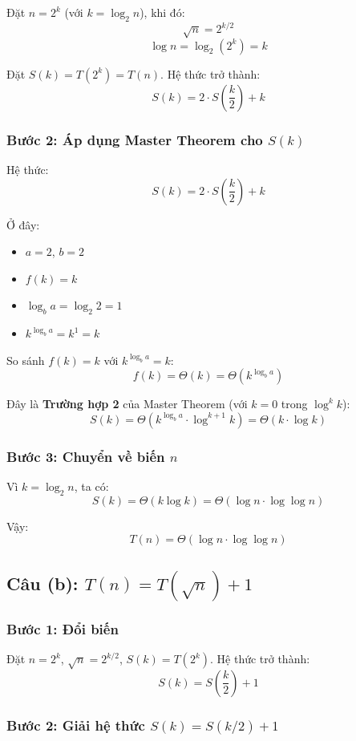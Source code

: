 \documentclass{article}
\begin{document}
Đặt \(n = 2^k\) (với \(k = \log_2 n\)), khi đó:
\[
\sqrt{n} = 2^{k/2}
\]
\[
\log n = \log_2(2^k) = k
\]

Đặt \(S(k) = T(2^k) = T(n)\). Hệ thức trở thành:
\[
S(k) = 2 \cdot S\left(\frac{k}{2}\right) + k
\]

\subsubsection{Bước 2: Áp dụng Master Theorem cho \(S(k)\)}

Hệ thức:
\[
S(k) = 2 \cdot S\left(\frac{k}{2}\right) + k
\]

Ở đây:
\begin{itemize}
    \item \(a = 2\), \(b = 2\)
    \item \(f(k) = k\)
    \item \(\log_b a = \log_2 2 = 1\)
    \item \(k^{\log_b a} = k^1 = k\)
\end{itemize}

So sánh \(f(k) = k\) với \(k^{\log_b a} = k\):
\[
f(k) = \Theta(k) = \Theta(k^{\log_b a})
\]

Đây là \textbf{Trường hợp 2} của Master Theorem (với \(k = 0\) trong \(\log^k k\)):
\[
S(k) = \Theta(k^{\log_b a} \cdot \log^{k+1} k) = \Theta(k \cdot \log k)
\]

\subsubsection{Bước 3: Chuyển về biến \(n\)}

Vì \(k = \log_2 n\), ta có:
\[
S(k) = \Theta(k \log k) = \Theta(\log n \cdot \log \log n)
\]

Vậy:
\[
\boxed{T(n) = \Theta(\log n \cdot \log \log n)}
\]

\subsection{Câu (b): \( T(n) = T(\sqrt{n}) + 1 \)}

\subsubsection{Bước 1: Đổi biến}

Đặt \(n = 2^k\), \(\sqrt{n} = 2^{k/2}\), \(S(k) = T(2^k)\). Hệ thức trở thành:
\[
S(k) = S\left(\frac{k}{2}\right) + 1
\]

\subsubsection{Bước 2: Giải hệ thức \(S(k) = S(k/2) + 1\)}
\end{document}
